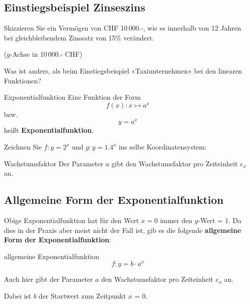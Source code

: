 \subsection{Einstiegsbeispiel Zinseszins}
Skizzieren Sie ein Vermögen von CHF 10\,000.-, wie es  innerhalb
von 12 Jahren bei gleichbleibendem Zinssatz von 15\% verändert.


($y$-Achse in 10\,000.- CHF)



Was ist anders, als beim Einstiegsbeispiel «Taxiunternehmen» bei den
linearen Funktionen?
\newpage
\begin{definition}{Exponentialfunktion}{}
  Eine Funktion der Form $$f(x): x \mapsto a^x$$
  bzw. $$y = a^x$$
  heißt \textbf{Exponentialfunktion}.
\end{definition}

Zeichnen Sie $f: y=2^x$ und $g: y=1.4^x$ ins selbe Koordinatensystem:





\begin{bemerkung}{Wachstumsfaktor}{}
Der Parameter $a$ gibt den Wachstumsfaktor pro Zeiteinheit $e_x$ an.
\end{bemerkung}

\newpage

\subsection{Allgemeine Form der Exponentialfunktion}

Obige Exponentialfunktion hat für den Wert $x=0$ immer den $y$-Wert = 1. Da dies in der Praxis aber meist nicht der Fall ist, gib es die folgende \textbf{allgemeine Form der Exponentialfunktion}:

\begin{definition}{allgemeine Exponentialfunktion}{}
$$f: y = b\cdot{}a^x$$

Auch hier gibt der Parameter $a$ den Wachstumsfaktor pro Zeiteinheit $e_x$ an.

Dabei ist $b$ der Startwert zum Zeitpunkt $x$ = 0.
\end{definition}


